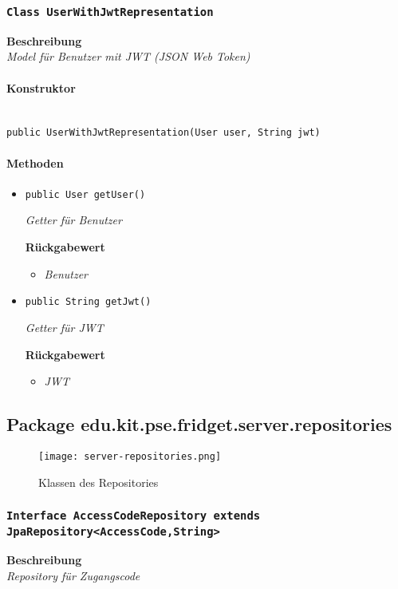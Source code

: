     \subsubsection{\texttt{Class UserWithJwtRepresentation}}
     \textbf{Beschreibung} \\
     \textit{Model für Benutzer mit JWT (JSON Web Token)}
     \paragraph*{Konstruktor}\mbox{} \\
     \texttt{public UserWithJwtRepresentation(User user, String jwt)}
     \paragraph*{Methoden}
     \begin{itemize}
     	\item{\texttt{public User getUser()}}
     	
     	\textit{Getter für Benutzer}
     	
     	\textbf{Rückgabewert}
     	\begin{itemize}
     		\item\textit{Benutzer}
     	\end{itemize}
     
     \item{\texttt{public String getJwt()}}
     	
     	\textit{Getter für JWT}
     	
     	\textbf{Rückgabewert}
     	\begin{itemize}
     		\item\textit{JWT}
     	\end{itemize}
     \end{itemize}
 
     \subsection{Package edu.kit.pse.fridget.server.repositories}
     \begin{figure}[H]
	       \centering
	       \texttt{[image: server-repositories.png]}
	       \caption{Klassen des Repositories}
	      \end{figure}
     \subsubsection{\texttt{Interface AccessCodeRepository extends JpaRepository<AccessCode,String>}}
     \textbf{Beschreibung} \\
     \textit{Repository für Zugangscode}
